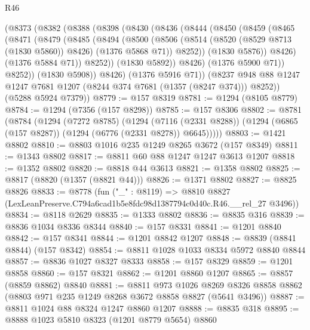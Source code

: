 \begin{lexlean}{R46}
\begin{coremodule}
      (@8373
        (@8382
          (@8388
            (@8398
              (@8430
                (@8436
                  (@8444
                    (@8450
                      (@8459
                        (@8465
                          (@8471
                            (@8479
                              (@8485
                                (@8494
                                  (@8500
                                    (@8506
                                      (@8514
                                        (@8520 (@8529 @8713 (@1830 @5860)) @8426)
                                        (@1376 @5868 @71))
                                      @8252))
                                  (@1830 @5876))
                                @8426)
                              (@1376 @5884 @71))
                            @8252))
                        (@1830 @5892))
                      @8426)
                    (@1376 @5900 @71))
                  @8252))
              (@1830 @5908))
            @8426)
          (@1376 @5916 @71))
        (@8237 @948 @88 @1247 @1247 @7681 @1207 (@8244 @374 @7681 (@1357 (@8247 @374))) @8252))
      (@5288 @5924 @7379))
@8779 := @157 @8319
@8781 := @1294 (@8105 @8779)
@8784 := @1294 (@7356 (@157 @8298))
@8785 := @157 @8306
@8802 := @8781
    (@8784
      (@1294
        (@7272 @8785)
        (@1294
          (@7116 (@2331 @8288))
          (@1294 (@6865 (@157 @8287)) (@1294 (@6776 (@2331 @8278)) @6645)))))
@8803 := @1421 @8802
@8810 := @8803 @1016 @235 @1249 @8265 @3672 (@157 @8349)
@8811 := @1343 @8802
@8817 := @8811 @60 @88 @1247 @1247 @3613 @1207
@8818 := @1352 @8802
@8820 := @8818 @44 @3613
@8821 := @1358 @8802
@8825 := @8817 (@8820 (@1357 (@8821 @44)))
@8826 := @1371 @8802
@8827 := @8825 @8826
@8833 := @8778
    (fun ("_" : @8119) =>
    @8810 @8827 (LexLeanPreserve.C794a6cad1b5e8fdc98d1387794c0d40c.R46.__rel_27 @3496))
@8834 := @8118 @2629
@8835 := @1333 @8802
@8836 := @8835 @316
@8839 := @8836 @1034 @8336 @8344
@8840 := @157 @8331
@8841 := @1201 @8840
@8842 := @157 @8341
@8844 := @1201 @8842 @1207
@8848 := @8839 (@8841 @8844) (@157 @8342)
@8854 := @8811 @1028 @1033 @8334 @5972 @8840 @8844
@8857 := @8836 @1027 @8327 @8333
@8858 := @157 @8329
@8859 := @1201 @8858
@8860 := @157 @8321
@8862 := @1201 @8860 @1207
@8865 := @8857 (@8859 @8862) @8840
@8881 := @8811
    @973
    @1026
    @8269
    @8326
    @8858
    @8862
    (@8803 @971 @235 @1249 @8268 @3672 @8858 @8827 (@5641 @3496))
@8887 := @8811 @1024 @88 @8324 @1247 @8860 @1207
@8888 := @8835 @318
@8895 := @8888 @1023 @5810 @8323 (@1201 @8779 @5654) @8860

\end{coremodule}
\end{lexlean}

